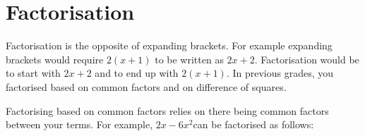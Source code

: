          \section{ Factorisation}
    \nopagebreak
            \nopagebreak
        \label{m39383*id268725}Factorisation is the opposite of expanding brackets. For example expanding brackets would require $2\left(x+1\right)$ to be written as $2x+2$. Factorisation would be to start with $2x+2$\hspace{1ex} and to end up with $2\left(x+1\right)$. In previous grades, you factorised based on common factors and on difference of squares.\par 
        \label{m39383*uid6}
            \nopagebreak
          \label{m39383*id268808}Factorising based on common factors relies on there being common factors between your terms. For example, $2x-6{x}^{2}$\hspace{1ex}can be factorised as follows:\par 
          \label{m39383*id268835}\nopagebreak\noindent{}
